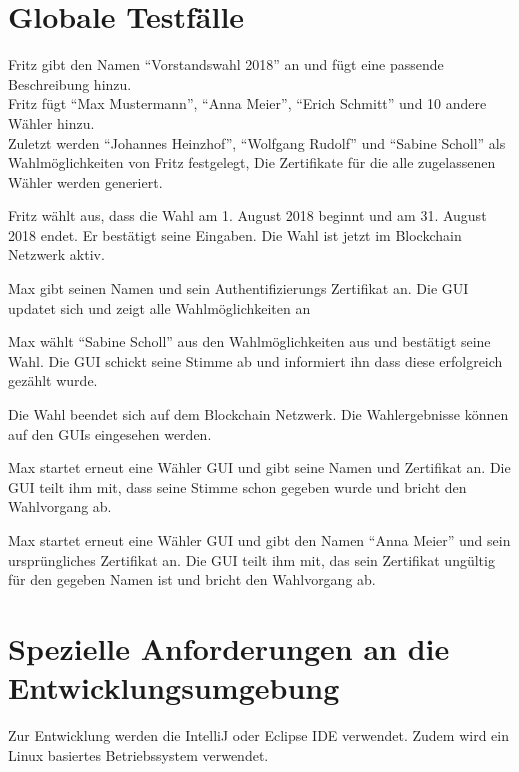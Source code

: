 \documentclass[parskip=full,11pt,twoside]{scrartcl}
\begin{document}
\section{Globale Testfälle}

		{Fritz gibt den Namen \enquote{Vorstandswahl 2018} an und fügt eine passende Beschreibung hinzu.\\
		Fritz fügt \enquote{Max Mustermann}, \enquote{Anna Meier}, \enquote{Erich Schmitt} und 10 andere Wähler hinzu.\\
		Zuletzt werden \enquote{Johannes Heinzhof}, \enquote{Wolfgang Rudolf} und \enquote{Sabine Scholl} als Wahlmöglichkeiten von Fritz festgelegt,}
		{Die Zertifikate für die alle zugelassenen Wähler werden generiert.}
		
\teststep{}
		{Fritz wählt aus, dass die Wahl am 1. August 2018 beginnt und am 31. August 2018 endet. Er bestätigt seine Eingaben.}
		{Die Wahl ist jetzt im Blockchain Netzwerk aktiv.}

		{Max gibt seinen Namen und sein Authentifizierungs Zertifikat an.}
		{Die GUI updatet sich und zeigt alle Wahlmöglichkeiten an}
		
\teststep{}
		{Max wählt \enquote{Sabine Scholl} aus den Wahlmöglichkeiten aus und bestätigt seine Wahl.}
		{Die GUI schickt seine Stimme ab und informiert ihn dass diese erfolgreich gezählt wurde.}
		
		{Die Wahl beendet sich auf dem Blockchain Netzwerk.}
		{Die Wahlergebnisse können auf den GUIs eingesehen werden.}
		

		{Max startet erneut eine Wähler GUI und gibt seine Namen und Zertifikat an.}
		{Die GUI teilt ihm mit, dass seine Stimme schon gegeben wurde und bricht den Wahlvorgang ab.}

\teststep{}
		{Max startet erneut eine Wähler GUI und gibt den Namen \enquote{Anna Meier} und sein ursprüngliches Zertifikat an.}
		{Die GUI teilt ihm mit, das sein Zertifikat ungültig für den gegeben Namen ist und bricht den Wahlvorgang ab.}

\section{Spezielle Anforderungen an die Entwicklungsumgebung}
Zur Entwicklung werden die IntelliJ oder Eclipse IDE verwendet.
Zudem wird ein Linux basiertes Betriebssystem verwendet.
\end{document}
